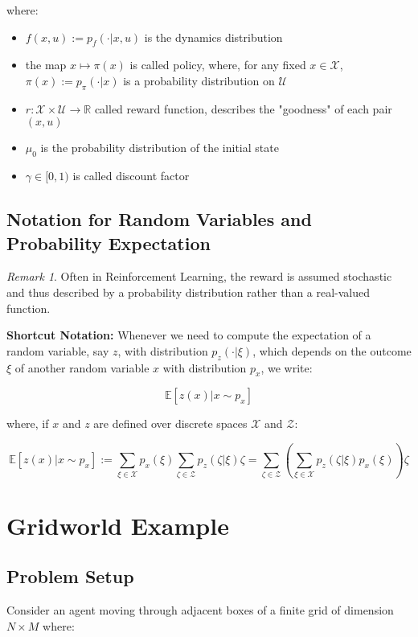 \documentclass[openany]{book}
\theoremstyle{definition}
\theoremstyle{remark}
\newtheorem*{remark}{Remark}
\begin{document}
where:
\begin{itemize}
    \item $f(x,u) := p_f(\cdot|x,u)$ is the dynamics distribution
    \item the map $x \mapsto \pi(x)$ is called policy, where, for any fixed $x \in \mathcal{X}$, $\pi(x) := p_\pi(\cdot|x)$ is a probability distribution on $\mathcal{U}$
    \item $r : \mathcal{X} \times \mathcal{U} \to \mathbb{R}$ called reward function, describes the "goodness" of each pair $(x,u)$
    \item $\mu_0$ is the probability distribution of the initial state
    \item $\gamma \in [0,1)$ is called discount factor
\end{itemize}

\subsection{Notation for Random Variables and Probability Expectation}
\begin{remark}
Often in Reinforcement Learning, the reward is assumed stochastic and thus described by a probability distribution rather than a real-valued function.
\end{remark}

\textbf{Shortcut Notation:} Whenever we need to compute the expectation of a random variable, say $z$, with distribution $p_z(\cdot|\xi)$, which depends on the outcome $\xi$ of another random variable $x$ with distribution $p_x$, we write:

\[
\mathbb{E}[z(x)|x \sim p_x]
\]

where, if $x$ and $z$ are defined over discrete spaces $\mathcal{X}$ and $\mathcal{Z}$:

\[
\mathbb{E}[z(x)|x \sim p_x] := \sum_{\xi\in\mathcal{X}} p_x(\xi) \sum_{\zeta\in\mathcal{Z}} p_z(\zeta|\xi)\zeta = \sum_{\zeta\in\mathcal{Z}} \left(\sum_{\xi\in\mathcal{X}} p_z(\zeta|\xi)p_x(\xi)\right) \zeta
\]

\section{Gridworld Example}
\subsection{Problem Setup}
Consider an agent moving through adjacent boxes of a finite grid of dimension $N \times M$ where:
\end{document}

